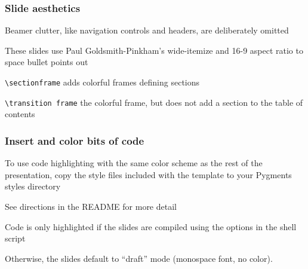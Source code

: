 \documentclass[aspectratio=169,handout]{beamer}
\begin{document}
	
	
\begin{frame}
	\frametitle{Slide aesthetics}
	\begin{witem}
		\item Beamer clutter, like navigation controls and headers, are deliberately omitted
		\item These slides use Paul Goldsmith-Pinkham's wide-itemize and 16-9 aspect ratio to space bullet points out
			\href{https://github.com/paulgp/beamer-tips}{}
		\item \texttt{\textbackslash{}sectionframe} adds colorful frames defining sections
		\item \texttt{\textbackslash{}transition frame} the colorful frame, but does not add a section to the table of contents
	\end{witem}
\end{frame}









\begin{frame}
	\frametitle{Insert and color bits of code}
	\begin{witem}
		\item To use code highlighting with the same color scheme as
			the rest of the presentation, copy the style files included
			with the template to your Pygments styles directory
		\item See directions in the README for more detail
		\item Code is only highlighted if the slides are compiled using the
			options in the shell script
		\item Otherwise, the slides default to ``draft'' mode (monospace font,
			no color).
	\end{witem}
\end{frame}
\end{document}
